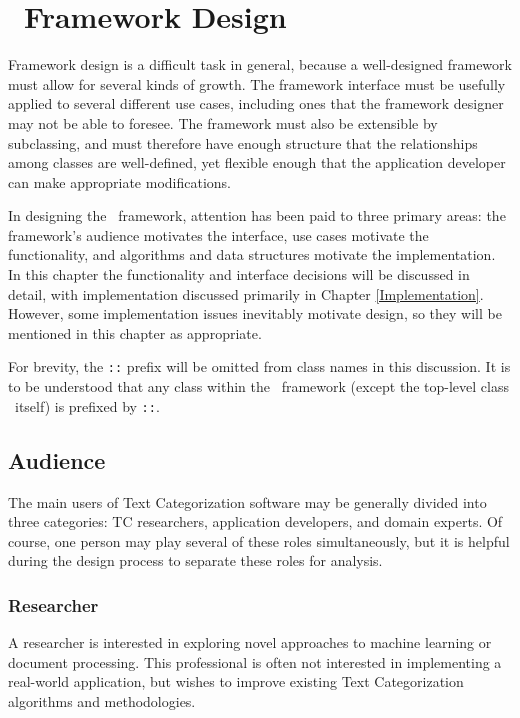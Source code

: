 \chapter{\aicat\ Framework Design}
\label{design}

Framework design is a difficult task in general, because a
well-designed framework must allow for several kinds of
growth. \cite[p. 11]{fayad:99} The framework interface must be
usefully applied to several different use cases, including ones that
the framework designer may not be able to foresee.  The framework must
also be extensible by subclassing, and must therefore have enough
structure that the relationships among classes are well-defined, yet
flexible enough that the application developer can make appropriate
modifications.

In designing the \aicat\ framework, attention has been paid to three
primary areas: the framework's audience motivates the interface, use
cases motivate the functionality, and algorithms and data structures
motivate the implementation.  In this chapter the functionality and
interface decisions will be discussed in detail, with implementation
discussed primarily in Chapter \ref{Implementation}.  However, some
implementation issues inevitably motivate design, so they will be
mentioned in this chapter as appropriate.

For brevity, the \aicat\texttt{::} prefix will be omitted from class
names in this discussion.  It is to be understood that any class
within the \aicat\ framework (except the top-level class
\aicat\ itself) is prefixed by \aicat\texttt{::}.

\section{Audience}

The main users of Text Categorization software may be generally
divided into three categories: TC researchers, application developers,
and domain experts.  Of course, one person may play several of these
roles simultaneously, but it is helpful during the design process to
separate these roles for analysis.

\subsection{Researcher}

A researcher is interested in exploring novel approaches to machine
learning or document processing.  This professional is often not
interested in implementing a real-world application, but wishes to
improve existing Text Categorization algorithms and methodologies.

